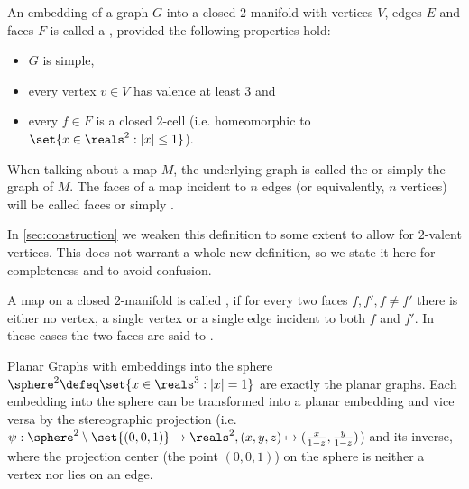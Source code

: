 \begin{definition} \label{def:map} An embedding of a graph $G$ into a closed $2$-manifold with vertices $V$, edges $E$ and faces $F$ is called a , provided the following properties hold:
  \begin{itemize}
  \item $G$ is simple,
  \item every vertex $v \in V$ has valence at least $3$ and
  \item every $f \in F$ is a closed $2$-cell (i.e. homeomorphic to $\set{x \in \reals^2 : |x| \leq 1}$).
  \end{itemize}
  When talking about a map $M$, the underlying graph is called the  or simply the graph of $M$. The faces of a map incident to $n$ edges (or equivalently, $n$ vertices) will be called  faces or simply .
\end{definition}

\begin{remark}
  In \autoref{sec:construction} we weaken this definition to some extent to allow for $2$-valent vertices. This does not warrant a whole new definition, so we state it here for completeness and to avoid confusion.
\end{remark}

\begin{definition} \label{def:polymap} A map on a closed $2$-manifold is called , if for every two faces $f, f', f \neq f'$ there is either no vertex, a single vertex or a single edge incident to both $f$ and $f'$. In these cases the two faces are said to .
\end{definition}

\begin{remark} Planar Graphs with embeddings into the sphere $\sphere^2\defeq\set{x\in\reals^3:|x|=1}$ are exactly the planar graphs. Each embedding into the sphere can be transformed into a planar embedding and vice versa by the stereographic projection (i.e. $\psi: \sphere^2 \setminus \set{(0, 0, 1)} \to \reals^2,\linebreak (x, y, z) \mapsto (\frac{x}{1-z}, \frac{y}{1-z})$) and its inverse, where the projection center (the point $(0, 0, 1)$) on the sphere is neither a vertex nor lies on an edge.
\end{remark}

